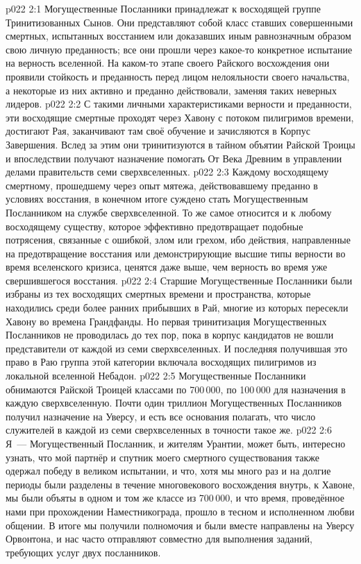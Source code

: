 \vs p022 2:1 Могущественные Посланники принадлежат к восходящей группе Тринитизованных Сынов. Они представляют собой класс ставших совершенными смертных, испытанных восстанием или доказавших иным равнозначным образом свою личную преданность; все они прошли через какое\hyp{}то конкретное испытание на верность вселенной. На каком\hyp{}то этапе своего Райского восхождения они проявили стойкость и преданность перед лицом нелояльности своего начальства, а некоторые из них активно и преданно действовали, заменяя таких неверных лидеров.
\vs p022 2:2 С такими личными характеристиками верности и преданности, эти восходящие смертные проходят через Хавону с потоком пилигримов времени, достигают Рая, заканчивают там своё обучение и зачисляются в Корпус Завершения. Вслед за этим они тринитизуются в тайном объятии Райской Троицы и впоследствии получают назначение помогать От Века Древним в управлении делами правительств семи сверхвселенных.
\vs p022 2:3 Каждому восходящему смертному, прошедшему через опыт мятежа, действовавшему преданно в условиях восстания, в конечном итоге суждено стать Могущественным Посланником на службе сверхвселенной. То же самое относится и к любому восходящему существу, которое эффективно предотвращает подобные потрясения, связанные с ошибкой, злом или грехом, ибо действия, направленные на предотвращение восстания или демонстрирующие высшие типы верности во время вселенского кризиса, ценятся даже выше, чем верность во время уже свершившегося восстания.
\vs p022 2:4 Старшие Могущественные Посланники были избраны из тех восходящих смертных времени и пространства, которые находились среди более ранних прибывших в Рай, многие из которых пересекли Хавону во времена Грандфанды. Но первая тринитизация Могущественных Посланников не проводилась до тех пор, пока в корпус кандидатов не вошли представители от каждой из семи сверхвселенных. И последняя получившая это право в Раю группа этой категории включала восходящих пилигримов из локальной вселенной Небадон.
\vs p022 2:5 Могущественные Посланники обнимаются Райской Троицей классами по 700\,000, по 100\,000 для назначения в каждую сверхвселенную. Почти один триллион Могущественных Посланников получил назначение на Уверсу, и есть все основания полагать, что число служителей в каждой из семи сверхвселенных в точности такое же.
\vs p022 2:6 \pc Я~--- Могущественный Посланник, и жителям Урантии, может быть, интересно узнать, что мой партнёр и спутник моего смертного существования также одержал победу в великом испытании, и что, хотя мы много раз и на долгие периоды были разделены в течение многовекового восхождения внутрь, к Хавоне, мы были объяты в одном и том же классе из 700\,000, и что время, проведённое нами при прохождении Наместникограда, прошло в тесном и исполненном любви общении. В итоге мы получили полномочия и были вместе направлены на Уверсу Орвонтона, и нас часто отправляют совместно для выполнения заданий, требующих услуг двух посланников.
